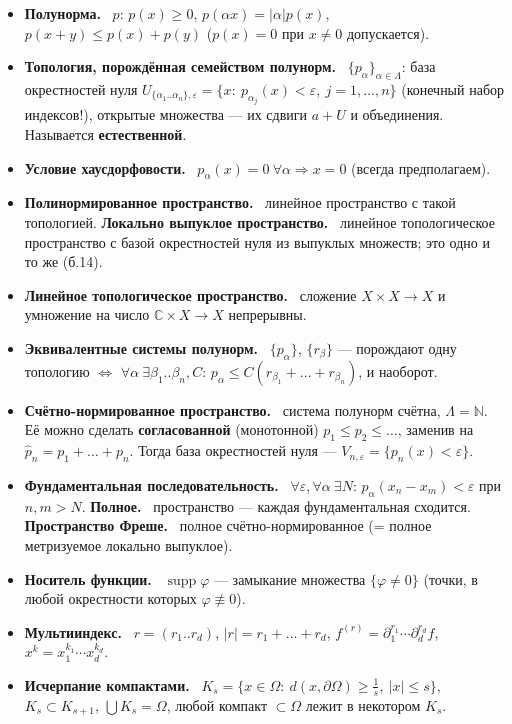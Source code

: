 \documentclass[11pt,a4paper]{article}
\newcommand{\CC}{\mathbb C}
\newcommand{\NN}{\mathbb N}
\newcommand{\supp}{\operatorname{supp}}
\newcommand{\df}[1]{\textbf{#1.}~}
\begin{document}
\begin{defs}
\begin{itemize}
\item \df{Полунорма} $p$: $p(x)\ge0$, $p(\alpha x)=|\alpha|p(x)$, $p(x+y)\le p(x)+p(y)$ ($p(x)=0$ при $x\ne0$ допускается).
\item \df{Топология, порождённая семейством полунорм} $\{p_\alpha\}_{\alpha\in\Lambda}$: база окрестностей нуля
$U_{\{\alpha_1..\alpha_n\},\varepsilon}=\{x:\ p_{\alpha_j}(x)<\varepsilon,\ j=1,\dots,n\}$ (конечный набор индексов!), открытые множества — их сдвиги $a+U$ и объединения. Называется \textbf{естественной}.
\item \df{Условие хаусдорфовости} $p_\alpha(x)=0\ \forall\alpha\Rightarrow x=0$ (всегда предполагаем).
\item \df{Полинормированное пространство} линейное пространство с такой топологией. \df{Локально выпуклое пространство} линейное топологическое пространство с базой окрестностей нуля из выпуклых множеств; это одно и то же (б.14).
\item \df{Линейное топологическое пространство} сложение $X\times X\to X$ и умножение на число $\CC\times X\to X$ непрерывны.
\item \df{Эквивалентные системы полунорм} $\{p_\alpha\}$, $\{r_\beta\}$ — порождают одну топологию $\iff$ $\forall\alpha\ \exists\beta_1..\beta_n,C$: $p_\alpha\le C(r_{\beta_1}+\dots+r_{\beta_n})$, и наоборот.
\item \df{Счётно-нормированное пространство} система полунорм счётна, $\Lambda=\NN$. Её можно сделать \textbf{согласованной} (монотонной) $p_1\le p_2\le\dots$, заменив на $\hat p_n=p_1+\dots+p_n$. Тогда база окрестностей нуля — $V_{n,\varepsilon}=\{p_n(x)<\varepsilon\}$.
\item \df{Фундаментальная последовательность} $\forall\varepsilon,\forall\alpha\ \exists N$: $p_\alpha(x_n-x_m)<\varepsilon$ при $n,m>N$. \df{Полное} пространство — каждая фундаментальная сходится. \df{Пространство Фреше} полное счётно-нормированное (= полное метризуемое локально выпуклое).
\item \df{Носитель функции} $\supp\varphi$ — замыкание множества $\{\varphi\ne0\}$ (точки, в любой окрестности которых $\varphi\not\equiv0$).
\item \df{Мультииндекс} $r=(r_1..r_d)$, $|r|=r_1+\dots+r_d$, $f^{(r)}=\partial_1^{r_1}\cdots\partial_d^{r_d}f$, $x^k=x_1^{k_1}\cdots x_d^{k_d}$.
\item \df{Исчерпание компактами} $K_s=\{x\in\Omega:\ d(x,\partial\Omega)\ge\frac1s,\ |x|\le s\}$, $K_s\subset K_{s+1}$, $\bigcup K_s=\Omega$, любой компакт $\subset\Omega$ лежит в некотором $K_s$.
\end{itemize}
\end{defs}
\end{document}
